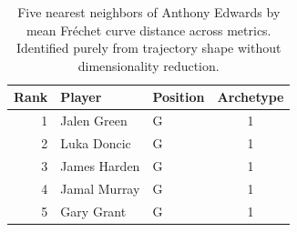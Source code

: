 \begin{table}[htbp]
  \centering\small
  \begin{tabular}{rllc}
    \toprule
    Rank & Player & Position & Archetype \\
    \midrule
    1 & Jalen Green & G & 1 \\
    2 & Luka Doncic & G & 1 \\
    3 & James Harden & G & 1 \\
    4 & Jamal Murray & G & 1 \\
    5 & Gary Grant & G & 1 \\
    \bottomrule
  \end{tabular}
  \caption{Five nearest neighbors of Anthony Edwards by mean Fr\'{e}chet curve distance across metrics. Identified purely from trajectory shape without dimensionality reduction.}
  \label{tab:Anthony_Edwards_frechet_curve_neighbors}
\end{table}

